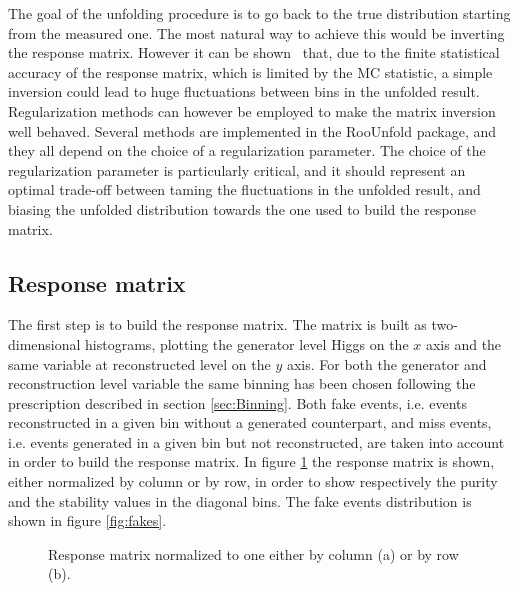 The goal of the unfolding procedure is to go back to the true distribution starting from the measured one. The most natural way to achieve this would be inverting the response matrix. However it can be shown~\cite{Cowan} that, due to the finite statistical accuracy of the response matrix, which is limited by the MC statistic, a simple inversion could lead to huge fluctuations between bins in the unfolded result. Regularization methods can however be employed to make the matrix inversion well behaved. Several methods are implemented in the RooUnfold package, and they all depend on the choice of a regularization parameter. The choice of the regularization parameter is particularly critical, and it should represent an optimal trade-off between taming the fluctuations in the unfolded result, and biasing the unfolded distribution towards the one used to build the response matrix. 

\subsection{Response matrix}
The first step is to build the response matrix.
The matrix is built as two-dimensional histograms, plotting the generator level Higgs \pt on the $x$ axis and the same variable at reconstructed level on the $y$ axis. For both the generator and reconstruction level variable the same binning has been chosen following the prescription described in section \ref{sec:Binning}.
Both fake events, i.e. events reconstructed in a given bin without a generated counterpart, and miss events, i.e. events generated in a given bin but not reconstructed, are taken into account in order to build the response matrix.
In figure \ref{fig:response_matrix} the response matrix is shown, either normalized by column or by row, in order to show respectively the purity and the stability values in the diagonal bins. The fake events distribution is shown in figure \ref{fig:fakes}. 
\begin{figure}[t]
\centering
{}
\caption{Response matrix normalized to one either by column (a) or by row (b).}
\label{fig:response_matrix}
\end{figure}

